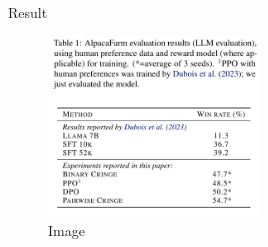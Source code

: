 \documentclass[10pt,xcolor={usenames,dvipsnames,table},aspectratio=169]{beamer}
\begin{document}
\begin{frame}{Result}
\begin{figure}
\centering    
\includegraphics[width=0.5\textwidth]{images/cr_loss.png}
\caption{Image}
\end{figure}
\end{frame}

\begin{frame}
    \printbibliography
\end{frame}
\end{document}
